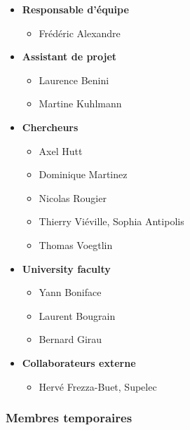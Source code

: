 \begin{itemize}
   \item \textbf{Responsable d'équipe}
      \begin{itemize}
         \item Frédéric Alexandre
      \end{itemize}
   \item \textbf{Assistant de projet}
      \begin{itemize}
         \item Laurence Benini
         \item Martine Kuhlmann 
      \end{itemize}
   \item \textbf{Chercheurs}
      \begin{itemize}
         \item Axel Hutt
         \item Dominique Martinez
         \item Nicolas Rougier
         \item Thierry Viéville, Sophia Antipolis
         \item Thomas Voegtlin 
      \end{itemize}
   \item \textbf{University faculty}
      \begin{itemize}
         \item Yann Boniface
         \item Laurent Bougrain
         \item Bernard Girau
      \end{itemize}
   \item \textbf{Collaborateurs externe}
      \begin{itemize}
         \item Hervé Frezza-Buet, Supelec
      \end{itemize}
\end{itemize}


\subsubsection{Membres temporaires} %
\label{ssub:Membres temporaires}

